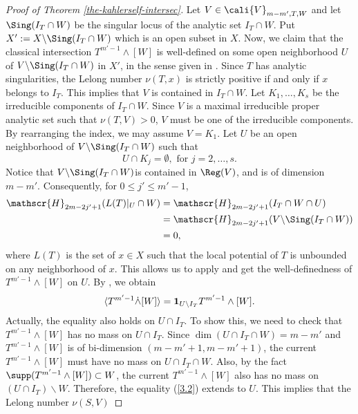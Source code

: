 \begin{proof}[Proof of Theorem \ref{the-kahlerself-intersec}]
        Let $V \in \cali{V}_{m-m',T,W}$ and  let $\Sing(I_T \cap W)$ be the singular locus of the analytic set $I_T \cap W$.  Put $X':= X \backslash \Sing(I_T \cap W)$ which is an open subset in $X$. Now, we claim that the classical intersection $T^{m'-1} \wedge [W]$ is well-defined on some open neighborhood $U$ of $V \backslash \Sing({I_{T} \cap W)}$ in $X'$, in the sense given in \cite[Chapter \uppercase\expandafter{}]{Demailly_ag}. Since $T$ has analytic singularities, the Lelong number $\nu(T,x)$ is strictly positive if and only if $x$ belongs to $I_T$. This implies that $V$ is contained in $I_{T} \cap W$. Let $K_1, \dots, K_s$ be the irreducible components of $I_{T} \cap W$. Since $V$ is a maximal irreducible proper analytic set such that $\nu(T,V)>0$, $V$ must be one of the irreducible components. By rearranging the index, we may assume $V=K_1$. Let $U$ be an open neighborhood of $V \backslash \Sing(I_{T} \cap W)$ such that 
        \[
            U \cap K_{j}= \emptyset, \mbox{ for }j= 2 , \dots , s.
        \]
        Notice that $V \backslash \Sing(I_T \cap W)$is  contained in $\Reg(V)$, and is of dimension $m-m'$. Consequently, for $0 \leq j' \leq m'-1$,
        \begin{align*}
            \mathscr{H}_{2m-2j'+1}(L(T)|_{U} \cap W) &= \mathscr{H}_{2m-2j'+1}(I_{T} \cap W \cap U)\\
            &= \mathscr{H}_{2m-2j'+1}(V \backslash \Sing(I_{T} \cap W))\\
            &=0,
        \end{align*}
        where $L(T)$ is the set of $x \in X$ such that the local potential of $T$ is unbounded on any neighborhood of $x$. This allows us to apply \cite[Chapter \uppercase\expandafter{}, Theorem 4.5]{Demailly_ag} and get 
        the well-definedness of $T^{m'-1} \wedge [W] $ on $U$. By \cite[Proposition 3.6]{Viet-generalized-nonpluri}, we obtain 
        \begin{align}
            \langle T^{m'-1} \dot{\wedge} [W] \rangle = \bold{1}_{U \backslash I_{T}} T^{m'-1} \wedge [W]. \label{3.2}
        \end{align}
        Actually, the equality also holds on $U \cap I_T$. To show this, we need to check that $T^{m'-1} \wedge [W]$ has no mass on $U \cap I_{T}$. Since $\dim(U \cap I_{T} \cap W)=m-m'$ and $T^{m'-1} \wedge [W]$ is of bi-dimension $(m-m'+1,m-m'+1)$, the current $T^{m'-1} \wedge [W]$ must have no mass on $U \cap I_{T} \cap W$. Also, by the fact $\supp (T^{m'-1} \wedge [W]) \subset W$, the current $T^{m'-1} \wedge [W]$ also has no mass on $(U \cap I_{T}) \backslash W$. Therefore, the equality (\ref{3.2}) extends to $U$. This implies that the Lelong number $\nu (S,V)$ 

\end{proof}
